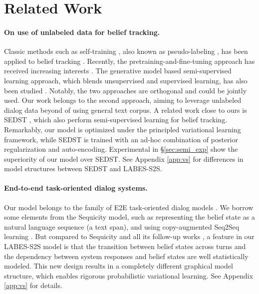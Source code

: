 \documentclass[11pt,a4paper]{article}
\newcommand{\modelname}{LABES}
\begin{document}
	
	\section{Related Work}
	
	\label{sec:related}
	\paragraph{On use of unlabeled data for belief tracking.}
	Classic methods such as self-training \cite{rosenberg2005semi}, also known as pseudo-labeling \cite{lee2013pseudo}, has been applied to belief tracking \cite{tseng2019semi}.
	Recently, the pretraining-and-fine-tuning approach has received increasing interests \cite{heck2020trippy,peng2020soloist,hosseini2020simple}. 
	The generative model based semi-supervised learning approach, which blends unsupervised and supervised learning, has also been studied \cite{wen2017latent, sedst}.
	Notably, the two approaches are orthogonal and could be jointly used. 
	Our work belongs to the second approach, aiming to leverage unlabeled dialog data beyond of using general text corpus.
	A related work close to ours is SEDST \cite{sedst}, which also perform semi-supervised learning for belief tracking.
	Remarkably, our model is optimized under the principled variational learning framework, while SEDST is trained with an ad-hoc combination of posterior regularization and auto-encoding.
	Experimental in \S\ref{sec:semi_exp} show the superiority of our model over SEDST. 
	See Appendix \ref{app:vs} for differences in model structures between SEDST and \modelname{}-S2S. 




\paragraph{End-to-end task-oriented dialog systems.}
	Our model belongs to the family of E2E task-oriented dialog models \cite{wen2017latent,wen2017a,li2017end,lei2018sequicity,mehri2019structured,wu2019alternating,peng2020soloist,hosseini2020simple}. We borrow some elements from the Sequicity \cite{lei2018sequicity} model, such as representing the belief state as a natural language sequence (a text span), and using copy-augmented Seq2Seq learning \cite{gu2016incorporating}. 
	But compared to Sequicity and all its follow-up works \cite{sedst,fsdm,zhang2020task,liang2020moss}, a feature in our LABES-S2S model is that the transition between belief states across turns and the dependency between system responses and belief states are well statistically modeled.
This new design results in a completely different graphical model structure, which enables rigorous probabilistic variational learning. See Appendix \ref{app:vs} for details. 
	
\end{document}
